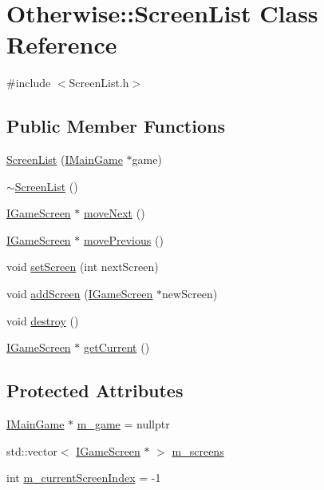 \hypertarget{class_otherwise_1_1_screen_list}{}\section{Otherwise\+:\+:Screen\+List Class Reference}
\label{class_otherwise_1_1_screen_list}


{\ttfamily \#include $<$Screen\+List.\+h$>$}

\subsection*{Public Member Functions}
\begin{DoxyCompactItemize}
\item 
\hyperlink{class_otherwise_1_1_screen_list_ab74ed0486008cb724c1afcd071bf01f3}{Screen\+List} (\hyperlink{class_otherwise_1_1_i_main_game}{I\+Main\+Game} $\ast$game)
\item 
\hyperlink{class_otherwise_1_1_screen_list_a4697122150d3d944eddb21240255c3ca}{$\sim$\+Screen\+List} ()
\item 
\hyperlink{class_otherwise_1_1_i_game_screen}{I\+Game\+Screen} $\ast$ \hyperlink{class_otherwise_1_1_screen_list_a9533daabbc08996cd5228e9eba9e0f39}{move\+Next} ()
\item 
\hyperlink{class_otherwise_1_1_i_game_screen}{I\+Game\+Screen} $\ast$ \hyperlink{class_otherwise_1_1_screen_list_ad3898a50d92e0c6bab52dcca9ee6a3f3}{move\+Previous} ()
\item 
void \hyperlink{class_otherwise_1_1_screen_list_a66cd1fe6595bb23202956cc9e0a36ce3}{set\+Screen} (int next\+Screen)
\item 
void \hyperlink{class_otherwise_1_1_screen_list_a45c8bbeb641888f1c6f2da2b0c2b7af0}{add\+Screen} (\hyperlink{class_otherwise_1_1_i_game_screen}{I\+Game\+Screen} $\ast$new\+Screen)
\item 
void \hyperlink{class_otherwise_1_1_screen_list_a02170d4a20cf77f9765cf8c55edd6d0a}{destroy} ()
\item 
\hyperlink{class_otherwise_1_1_i_game_screen}{I\+Game\+Screen} $\ast$ \hyperlink{class_otherwise_1_1_screen_list_a4d6113dbdfc9180e435b17325ef79cd1}{get\+Current} ()
\end{DoxyCompactItemize}
\subsection*{Protected Attributes}
\begin{DoxyCompactItemize}
\item 
\hyperlink{class_otherwise_1_1_i_main_game}{I\+Main\+Game} $\ast$ \hyperlink{class_otherwise_1_1_screen_list_a937cdad76d229b39827de63cc16911d1}{m\+\_\+game} = nullptr
\item 
std\+::vector$<$ \hyperlink{class_otherwise_1_1_i_game_screen}{I\+Game\+Screen} $\ast$ $>$ \hyperlink{class_otherwise_1_1_screen_list_a3237c433e2a02dc3644b62fe48afdb84}{m\+\_\+screens}
\item 
int \hyperlink{class_otherwise_1_1_screen_list_af52f5cb47e2592df1fa18556c0ad4726}{m\+\_\+current\+Screen\+Index} = -\/1
\end{DoxyCompactItemize}


